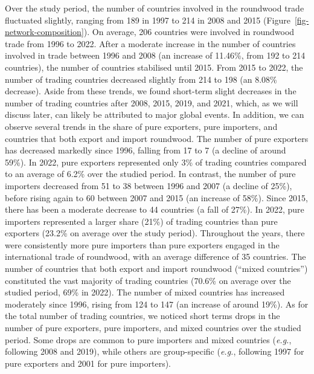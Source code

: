 \documentclass[
  authoryear,
  review,
  3p]{elsarticle}
\begin{document}
Over the study period, the number of countries involved in the roundwood
trade fluctuated slightly, ranging from 189 in 1997 to 214 in 2008 and
2015 (Figure~\ref{fig-network-composition}). On average, 206 countries
were involved in roundwood trade from 1996 to 2022. After a moderate
increase in the number of countries involved in trade between 1996 and
2008 (an increase of 11.46\%, from 192 to 214 countries), the number of
countries stabilised until 2015. From 2015 to 2022, the number of
trading countries decreased slightly from 214 to 198 (an 8.08\%
decrease). Aside from these trends, we found short-term slight decreases
in the number of trading countries after 2008, 2015, 2019, and 2021,
which, as we will discuss later, can likely be attributed to major
global events. In addition, we can observe several trends in the share
of pure exporters, pure importers, and countries that both export and
import roundwood. The number of pure exporters has decreased markedly
since 1996, falling from 17 to 7 (a decline of around 59\%). In 2022,
pure exporters represented only 3\% of trading countries compared to an
average of 6.2\% over the studied period. In contrast, the number of
pure importers decreased from 51 to 38 between 1996 and 2007 (a decline
of 25\%), before rising again to 60 between 2007 and 2015 (an increase
of 58\%). Since 2015, there has been a moderate decrease to 44 countries
(a fall of 27\%). In 2022, pure importers represented a larger share
(21\%) of trading countries than pure exporters (23.2\% on average over
the study period). Throughout the years, there were consistently more
pure importers than pure exporters engaged in the international trade of
roundwood, with an average difference of 35 countries. The number of
countries that both export and import roundwood (``mixed countries'')
constituted the vast majority of trading countries (70.6\% on average
over the studied period, 69\% in 2022). The number of mixed countries
has increased moderately since 1996, rising from 124 to 147 (an increase
of around 19\%). As for the total number of trading countries, we
noticed short terms drops in the number of pure exporters, pure
importers, and mixed countries over the studied period. Some drops are
common to pure importers and mixed countries (\emph{e.g.}, following
2008 and 2019), while others are group-specific (\emph{e.g.}, following
1997 for pure exporters and 2001 for pure importers).
\end{document}
